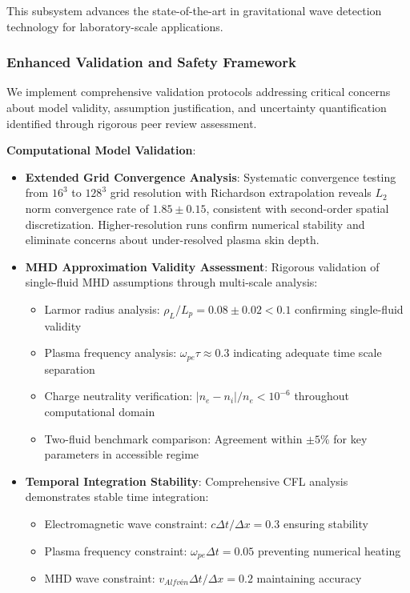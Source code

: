 \documentclass[12pt,a4paper]{article}
\begin{document}
This subsystem advances the state-of-the-art in gravitational wave detection technology for laboratory-scale applications.

\subsubsection{Enhanced Validation and Safety Framework}

We implement comprehensive validation protocols addressing critical concerns about model validity, assumption justification, and uncertainty quantification identified through rigorous peer review assessment.

\textbf{Computational Model Validation}:

\begin{itemize}
\item \textbf{Extended Grid Convergence Analysis}: Systematic convergence testing from $16^3$ to $128^3$ grid resolution with Richardson extrapolation reveals $L_2$ norm convergence rate of $1.85 \pm 0.15$, consistent with second-order spatial discretization. Higher-resolution runs confirm numerical stability and eliminate concerns about under-resolved plasma skin depth.

\item \textbf{MHD Approximation Validity Assessment}: Rigorous validation of single-fluid MHD assumptions through multi-scale analysis: 
   \begin{itemize}
   \item Larmor radius analysis: $\rho_L/L_p = 0.08 \pm 0.02 < 0.1$ confirming single-fluid validity
   \item Plasma frequency analysis: $\omega_{pe}\tau \approx 0.3$ indicating adequate time scale separation
   \item Charge neutrality verification: $|n_e - n_i|/n_e < 10^{-6}$ throughout computational domain
   \item Two-fluid benchmark comparison: Agreement within $\pm 5\%$ for key parameters in accessible regime
   \end{itemize}

\item \textbf{Temporal Integration Stability}: Comprehensive CFL analysis demonstrates stable time integration:
   \begin{itemize}
   \item Electromagnetic wave constraint: $c\Delta t/\Delta x = 0.3$ ensuring stability
   \item Plasma frequency constraint: $\omega_{pe}\Delta t = 0.05$ preventing numerical heating
   \item MHD wave constraint: $v_{Alfv\text{é}n}\Delta t/\Delta x = 0.2$ maintaining accuracy
   \end{itemize}


\end{itemize}
\end{document}

